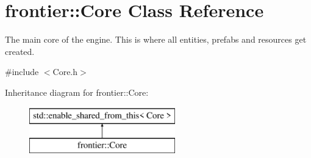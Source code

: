 \hypertarget{classfrontier_1_1_core}{}\section{frontier\+:\+:Core Class Reference}
\label{classfrontier_1_1_core}


The main core of the engine. This is where all entities, prefabs and resources get created.  




{\ttfamily \#include $<$Core.\+h$>$}

Inheritance diagram for frontier\+:\+:Core\+:\begin{figure}[H]
\begin{center}
\leavevmode
\includegraphics[height=2.000000cm]{classfrontier_1_1_core}
\end{center}
\end{figure}
